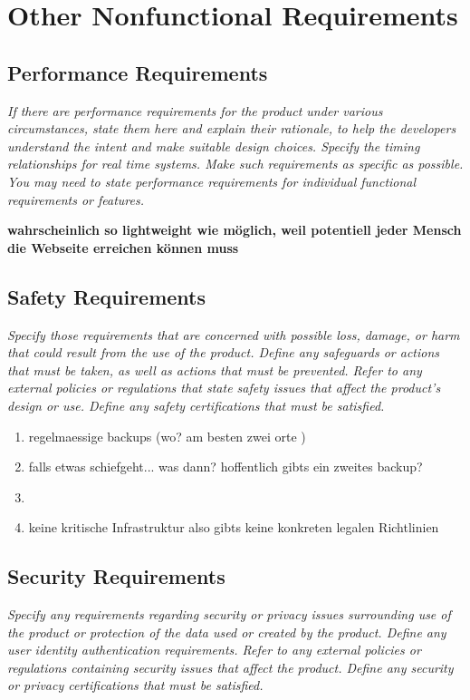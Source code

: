 \section{Other Nonfunctional Requirements}

\subsection{Performance Requirements}
\textit{If there are performance requirements for the product under various 
circumstances, state them here and explain their rationale, 
to help the developers understand the intent and make suitable design choices. 
Specify the timing relationships for real time systems. 
Make such requirements as specific as possible. 
You may need to state performance requirements 
for individual functional requirements or features.}

\textbf{wahrscheinlich so lightweight wie möglich, 
weil potentiell jeder Mensch die Webseite erreichen können muss}


\subsection{Safety Requirements}
\textit{Specify those requirements that are concerned 
with possible loss, damage, or harm that could result from the use of the product. 
Define any safeguards or actions that must be taken, as well as actions that must be prevented. 
Refer to any external policies or regulations that state safety issues that affect the product’s design or use. 
Define any safety certifications that must be satisfied.}


\begin{enumerate}
    \item regelmaessige backups (wo? am besten zwei orte )
    \item falls etwas schiefgeht... was dann? hoffentlich gibts ein zweites backup?
    \item 
    \item keine kritische Infrastruktur also gibts keine konkreten legalen Richtlinien
\end{enumerate}



\subsection{Security Requirements}
\textit{Specify any requirements regarding security or privacy issues 
surrounding use of the product or protection of the data used or created by the product.
Define any user identity authentication requirements. 
Refer to any external policies or regulations containing security issues that affect the product. 
Define any security or privacy certifications that must be satisfied.}

